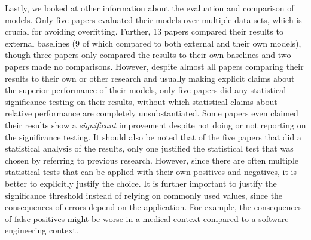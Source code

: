 \documentclass[a4paper]{article}
\begin{document}
Lastly, we looked at other information about the evaluation and comparison of models. Only five papers evaluated their models over multiple data sets, which is crucial for avoiding overfitting. Further, 13 papers compared their results to external baselines (9 of which compared to both external and their own models), though three papers only compared the results to their own baselines and two papers made no comparisons. However, despite almost all papers comparing their results to their own or other research and usually making explicit claims about the superior performance of their models, only five papers did any statistical significance testing on their results, without which statistical claims about relative performance are completely unsubstantiated. Some papers even claimed their results show a \textit{significant} improvement despite not doing or not reporting on the significance testing. It should also be noted that of the five papers that did a statistical analysis of the results, only one justified the statistical test that was chosen by referring to previous research. However, since there are often multiple statistical tests that can be applied with their own positives and negatives, it is better to explicitly justify the choice. It is further important to justify the significance threshold instead of relying on commonly used values, since the consequences of errors depend on the application. For example, the consequences of false positives might be worse in a medical context compared to a software engineering context.
\end{document}
